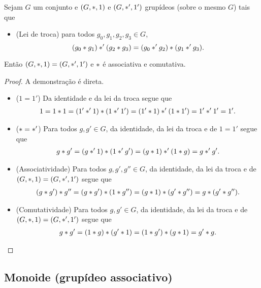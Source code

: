 \begin{proposition}
Sejam $G$ um conjunto e $(G,\ast,1)$ e $(G,\ast',1')$ grupídeos (sobre o mesmo $G$) tais que
	\begin{itemize}
		\item (Lei de troca) para todos $g_0,g_1,g_2,g_3 \in G$,
	\begin{equation*}
	(g_0 \ast g_1) \ast' (g_2 \ast g_3) = (g_0 \ast' g_2) \ast (g_1 \ast' g_3).
	\end{equation*}
	\end{itemize}
Então $(G,\ast,1) = (G,\ast',1')$ e $\ast$ é associativa e comutativa.
\end{proposition}
\begin{proof}
A demonstração é direta.
	\begin{itemize}
		\item ($1=1'$) Da identidade e da lei da troca segue que
		\begin{align*}
		1 = 1 \ast 1 = (1' \ast' 1) \ast (1 \ast' 1') = (1' \ast 1) \ast' (1 \ast 1') = 1' \ast' 1' = 1'.
		\end{align*}
		
		\item ($\ast = \ast'$) Para todos $g,g' \in G$, da identidade, da lei da troca e de $1=1'$ segue que
		\begin{align*}
		g \ast g' = (g \ast' 1) \ast (1 \ast' g') = (g \ast 1) \ast' (1 \ast g) = g \ast' g'.
		\end{align*}

		\item (Associatividade) Para todos $g,g',g'' \in G$, da identidade, da lei da troca e de $(G,\ast,1) = (G,\ast',1')$ segue que
		\begin{align*}
		(g \ast g') \ast g'' = (g \ast g') \ast (1 \ast g'') = (g \ast 1) \ast (g' \ast g'') = g \ast (g' \ast g'').
		\end{align*}

		\item (Comutatividade) Para todos $g,g' \in G$, da identidade, da lei da troca e de $(G,\ast,1) = (G,\ast',1')$ segue que
		\begin{align*}
		g \ast g' = (1 \ast g) \ast (g' \ast 1) = (1 \ast g') \ast (g \ast 1) = g' \ast g.
		\end{align*}
	\end{itemize}
\end{proof}

\subsection{Monoide (grupídeo associativo)}

